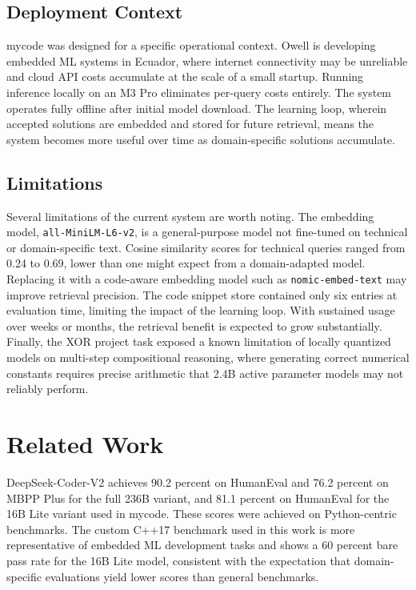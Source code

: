 \documentclass[11pt,twocolumn]{article}
\begin{document}
\subsection{Deployment Context}

mycode was designed for a specific operational context. Owell is developing
embedded ML systems in Ecuador, where internet connectivity may be unreliable
and cloud API costs accumulate at the scale of a small startup. Running
inference locally on an M3 Pro eliminates per-query costs entirely. The system
operates fully offline after initial model download. The learning loop, wherein
accepted solutions are embedded and stored for future retrieval, means the
system becomes more useful over time as domain-specific solutions accumulate.

\subsection{Limitations}

Several limitations of the current system are worth noting. The embedding
model, \texttt{all-MiniLM-L6-v2}, is a general-purpose model not fine-tuned
on technical or domain-specific text. Cosine similarity scores for technical
queries ranged from 0.24 to 0.69, lower than one might expect from a
domain-adapted model. Replacing it with a code-aware embedding model such as
\texttt{nomic-embed-text} may improve retrieval precision. The code snippet
store contained only six entries at evaluation time, limiting the impact of
the learning loop. With sustained usage over weeks or months, the retrieval
benefit is expected to grow substantially. Finally, the XOR project task
exposed a known limitation of locally quantized models on multi-step
compositional reasoning, where generating correct numerical constants requires
precise arithmetic that 2.4B active parameter models may not reliably perform.

\section{Related Work}

DeepSeek-Coder-V2 achieves 90.2 percent on HumanEval and 76.2 percent on
MBPP Plus for the full 236B variant, and 81.1 percent on HumanEval for the
16B Lite variant used in mycode. These scores were achieved on Python-centric
benchmarks. The custom C++17 benchmark used in this work is more representative
of embedded ML development tasks and shows a 60 percent bare pass rate for the
16B Lite model, consistent with the expectation that domain-specific
evaluations yield lower scores than general benchmarks.
\end{document}

